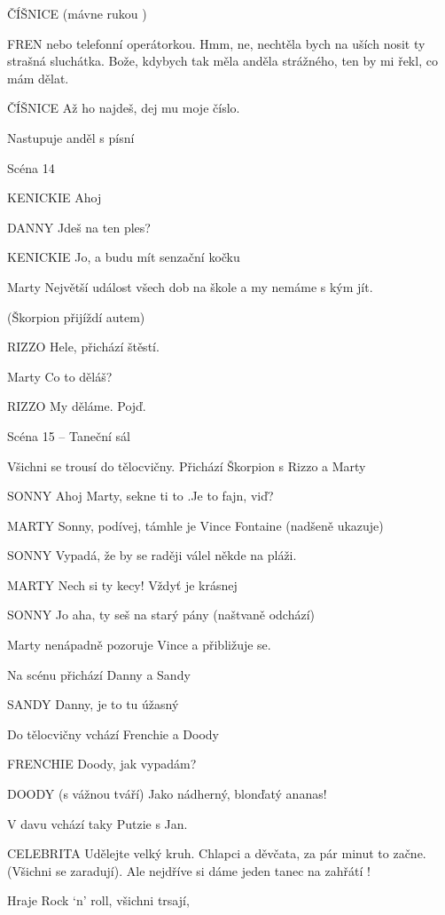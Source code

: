 ČÍŠNICE        (mávne rukou ) 

FREN        nebo telefonní operátorkou. Hmm, ne, nechtěla bych na uších nosit ty         strašná sluchátka. Bože, kdybych tak měla anděla strážného, ten by mi         řekl, co mám dělat. 

ČÍŠNICE         Až ho najdeš, dej mu moje číslo. 

Nastupuje anděl s písní 

Scéna 14 

KENICKIE                 Ahoj

DANNY        Jdeš na ten ples?

KENICKIE        Jo, a budu mít senzační kočku

Marty        Největší událost všech dob na škole a my nemáme s kým jít.

(Škorpion přijíždí autem)

RIZZO        Hele, přichází štěstí.

Marty        Co to děláš?

RIZZO        My děláme. Pojď.

Scéna 15 – Taneční sál 

Všichni se trousí do tělocvičny. Přichází Škorpion s Rizzo a Marty

SONNY        Ahoj Marty, sekne ti to .Je to fajn, viď? 

MARTY        Sonny, podívej, támhle je Vince Fontaine (nadšeně ukazuje) 

SONNY        Vypadá, že by se raději válel někde na pláži. 

MARTY        Nech si ty kecy! Vždyť je krásnej 

SONNY        Jo aha, ty seš na starý pány (naštvaně odchází) 

Marty nenápadně pozoruje Vince a přibližuje se. 

Na scénu přichází Danny a Sandy 

SANDY        Danny, je to tu úžasný

Do tělocvičny vchází Frenchie a Doody

FRENCHIE        Doody, jak vypadám? 

DOODY        (s vážnou tváří) Jako nádherný, blonďatý ananas! 

V davu vchází taky Putzie s Jan. 

CELEBRITA         Udělejte velký kruh. Chlapci a děvčata, za pár minut to začne.         (Všichni se zaradují). Ale nejdříve si dáme jeden tanec na zahřátí ! 

Hraje Rock ‘n’ roll, všichni trsají,

